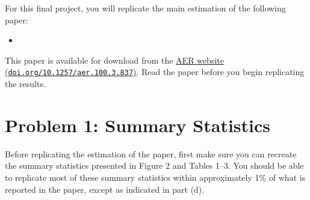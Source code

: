\documentclass[11pt,letterpaper]{article}
\begin{document}
For this final project, you will replicate the main estimation of the following paper:
\begin{itemize}[label={}, leftmargin=*]
	\item {}
\end{itemize}
This paper is available for download from the \href{https://doi.org/10.1257/aer.100.3.837}{AER website (\texttt{doi.org/10.1257/aer.100.3.837})}. Read the paper before you begin replicating the results.

\section*{Problem 1: Summary Statistics}

Before replicating the estimation of the paper, first make sure you can recreate the summary statistics presented in Figure 2 and Tables 1--3. You should be able to replicate most of these summary statistics within approximately 1\% of what is reported in the paper, except as indicated in part (d).
\end{document}
